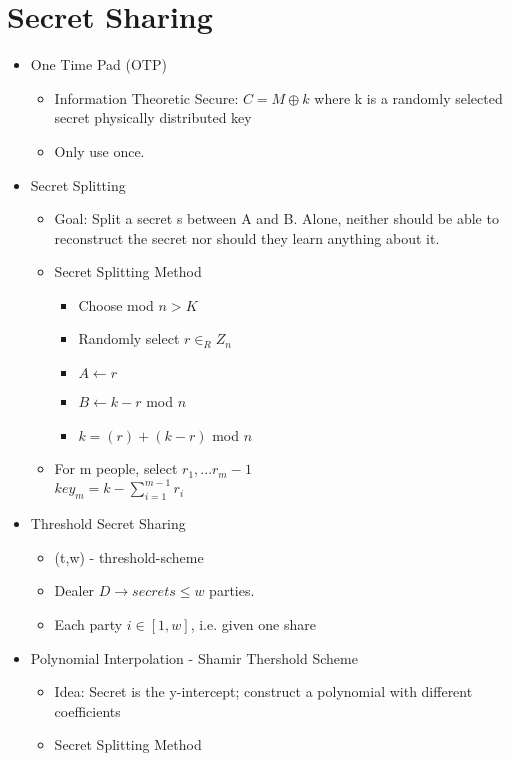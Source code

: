 \section{Secret Sharing}
\begin{itemize}
\item One Time Pad (OTP)
    \begin{itemize}
    \item Information Theoretic Secure: $C = M \oplus k$ where k is a randomly selected secret physically distributed key
    \item Only use once.
    \end{itemize}
\item Secret Splitting
    \begin{itemize}
    \item Goal: Split a secret s between A and B. Alone, neither should be able to reconstruct the secret nor should they learn anything about it.
    \item Secret Splitting Method
        \begin{itemize}
        \item Choose mod $n > K$
        \item Randomly select $r \in_R Z_n$
        \item $A \leftarrow r$
        \item $B \leftarrow k-r$ mod $n$
        \item $k = (r) + (k-r)$ mod $n$
        \end{itemize}
    \item For m people, select $r_1, ... r_m-1$
        \\$key_m = k - \sum_{i=1}^{m-1} r_i$
    \end{itemize}
\item Threshold Secret Sharing
    \begin{itemize}
    \item (t,w) - threshold-scheme
    \item Dealer $D \rightarrow secrets \le w$ parties.
    \item Each party $i \in [1,w]$, i.e. given one share
    \end{itemize}
\item Polynomial Interpolation - Shamir Thershold Scheme
    \begin{itemize}
    \item Idea: Secret is the y-intercept; construct a polynomial with different coefficients
    \item Secret Splitting Method

\end{itemize}
\end{itemize}
